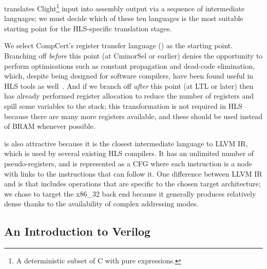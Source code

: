 \def\numcompcertlanguages{ten}

\compcert{} translates Clight\footnote{A deterministic subset of C with pure expressions.} input into assembly output via a sequence of intermediate languages; we must decide which of these \numcompcertlanguages{} languages is the most suitable starting point for the HLS-specific translation stages.

We select CompCert's register transfer language (\rtl{}) as the starting
point. Branching off \emph{before} this point (at CminorSel or earlier) denies
\compcert{} the opportunity to perform optimisations such as constant
propagation and dead-code elimination, which, despite being designed for
software compilers, have been found useful in HLS tools as
well~\cite{cong11_high_level_synth_fpgas}. And if we branch off \emph{after}
this point (at LTL or later) then \compcert{} has already performed register
allocation to reduce the number of registers and spill some variables to the
stack; this transformation is not required in HLS because there are many more
registers available, and these should be used instead of \gls{BRAM} whenever
possible. %

\rtl{} is also attractive because it is the closest intermediate language to
LLVM IR, which is used by several existing HLS
compilers. %
It has an unlimited number of pseudo-registers, and is represented as a
\gls{CFG} where each instruction is a node with links to the instructions that
can follow it. One difference between LLVM \gls{IR} and \rtl{} is that \rtl{} includes
operations that are specific to the chosen target architecture; we chose to
target the x86\_32 back end because it generally produces relatively dense \rtl{}
thanks to the availability of complex addressing
modes.%

\subsection{An Introduction to Verilog}

